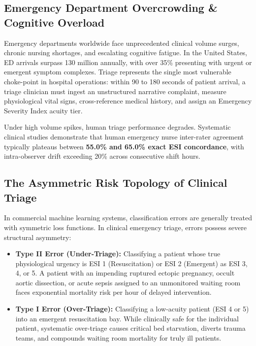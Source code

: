 \documentclass[11pt,a4paper]{article}
\begin{document}
\subsection{Emergency Department Overcrowding \& Cognitive Overload}
Emergency departments worldwide face unprecedented clinical volume surges, chronic nursing shortages, and escalating cognitive fatigue. In the United States, ED arrivals surpass 130 million annually, with over 35\% presenting with urgent or emergent symptom complexes. Triage represents the single most vulnerable choke-point in hospital operations: within 90 to 180 seconds of patient arrival, a triage clinician must ingest an unstructured narrative complaint, measure physiological vital signs, cross-reference medical history, and assign an Emergency Severity Index acuity tier.

Under high volume spikes, human triage performance degrades. Systematic clinical studies demonstrate that human emergency nurse inter-rater agreement typically plateaus between \textbf{55.0\% and 65.0\% exact ESI concordance}, with intra-observer drift exceeding 20\% across consecutive shift hours.

\subsection{The Asymmetric Risk Topology of Clinical Triage}
In commercial machine learning systems, classification errors are generally treated with symmetric loss functions. In clinical emergency triage, errors possess severe structural asymmetry:
\begin{itemize}[leftmargin=1.5em]
    \item \textbf{Type II Error (Under-Triage):} Classifying a patient whose true physiological urgency is ESI 1 (Resuscitation) or ESI 2 (Emergent) as ESI 3, 4, or 5. A patient with an impending ruptured ectopic pregnancy, occult aortic dissection, or acute sepsis assigned to an unmonitored waiting room faces exponential mortality risk per hour of delayed intervention.
    \item \textbf{Type I Error (Over-Triage):} Classifying a low-acuity patient (ESI 4 or 5) into an emergent resuscitation bay. While clinically safe for the individual patient, systematic over-triage causes critical bed starvation, diverts trauma teams, and compounds waiting room mortality for truly ill patients.
\end{itemize}
\end{document}
